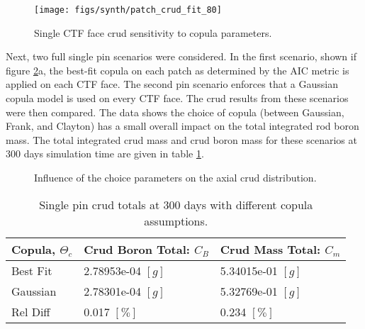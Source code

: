 \begin{figure}[H]
    \centering
    \texttt{[image: figs/synth/patch\_crud\_fit\_80]}
    \caption{Single CTF face crud sensitivity to copula parameters.}
    \label{fig:patchcrudfit80}
\end{figure}

Next, two full single pin scenarios were considered. In the first scenario, shown if figure \ref{fig:crud_copula_fam_sensi}a, the best-fit copula on each patch as determined by the AIC metric is applied on each CTF face.  The second pin scenario enforces that a Gaussian copula model is used on every CTF face.  The crud results from these scenarios were then compared.  The data shows the choice of copula (between Gaussian, Frank, and Clayton) has a small overall impact on the total integrated rod boron mass.   The total integrated crud mass and crud boron mass for these scenarios at 300 days simulation time are given in table \ref{tab:crud_totals_copula}.

\begin{figure}[H]%
    \centering
    \qquad
    \caption[]{Influence of the choice parameters on the axial crud distribution.}%
    \label{fig:crud_copula_fam_sensi}%
\end{figure}


\begin{table}[h]
    \begin{center}
        \caption[Crud totals with different copula assumptions.]{Single pin crud totals at 300 days with different copula assumptions.}
        \begin{tabular}[h]{|l | l | l |}
            \hline
            Copula, $\Theta_c$ & Crud Boron Total: $C_B$ & Crud Mass Total: $C_m$ \\
            \hline  \hline
            Best Fit &  2.78953e-04 $[g]$ & 5.34015e-01 $[g]$ \\
            Gaussian &  2.78301e-04 $[g]$ & 5.32769e-01 $[g]$ \\
            \hline
            Rel Diff &  0.017 $[\%]$ & 0.234 $[\%]$ \\
            \hline
        \end{tabular}
        \label{tab:crud_totals_copula}
    \end{center}
\end{table}

